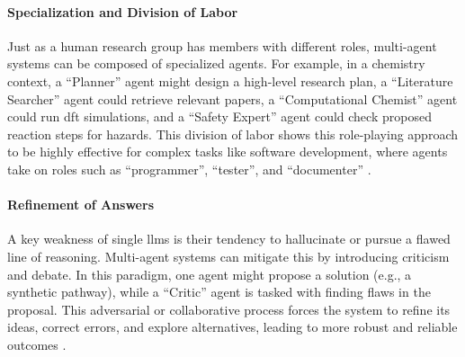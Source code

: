 \paragraph{Specialization and Division of Labor} \label{sec:multi-agent}
Just as a human research group has members with different roles, multi-agent systems can be composed of specialized agents. For example, in a chemistry context, a \enquote{Planner} agent might design a high-level research plan, a \enquote{Literature Searcher} agent could retrieve relevant papers, a \enquote{Computational Chemist} agent could run \gls{dft} simulations, and a \enquote{Safety Expert} agent could check proposed reaction steps for hazards.\autocite{Zou2025ElAgente} This division of labor shows this role-playing approach to be highly effective for complex tasks like software development, where agents take on roles such as \enquote{programmer}, \enquote{tester}, and \enquote{documenter} \autocite{qian2024chatdevcommunicativeagentssoftware}.

\paragraph{Refinement of Answers} A key weakness of single \glspl{llm} is their tendency to hallucinate or pursue a flawed line of reasoning. Multi-agent systems can mitigate this by introducing criticism and debate. In this paradigm, one agent might propose a solution (e.g., a synthetic pathway), while a \enquote{Critic} agent is tasked with finding flaws in the proposal. This adversarial or collaborative process forces the system to refine its ideas, correct errors, and explore alternatives, leading to more robust and reliable outcomes \autocite{liang2024encouragingdivergentthinkinglarge, du2023improving}. 

